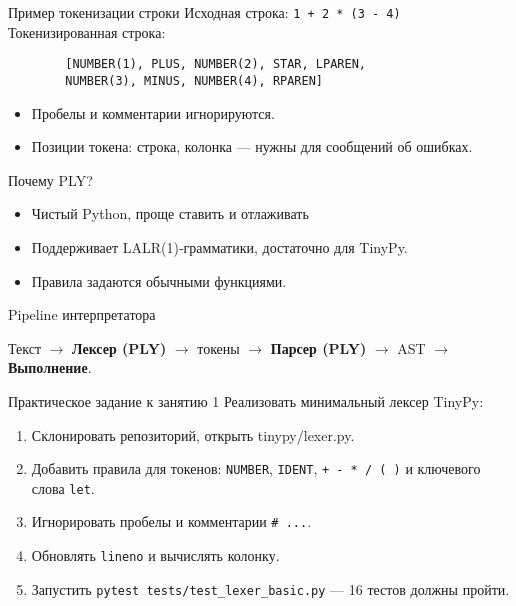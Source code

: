 \documentclass[aspectratio=169]{beamer}
\begin{document}
\begin{frame}[fragile]{Пример токенизации строки}
	Исходная строка: \texttt{1 + 2 * (3 - 4)} \newline
	Токенизированная строка:
	\begin{verbatim}
        [NUMBER(1), PLUS, NUMBER(2), STAR, LPAREN,
        NUMBER(3), MINUS, NUMBER(4), RPAREN]
    \end{verbatim}
	\begin{itemize}
		\item Пробелы и комментарии игнорируются.
		\item Позиции токена: строка, колонка — нужны для сообщений об ошибках.
	\end{itemize}
\end{frame}

\begin{frame}{Почему PLY?}
	\begin{itemize}
		\item Чистый Python, проще ставить и отлаживать
		\item Поддерживает LALR(1)‑грамматики, достаточно для TinyPy.
		\item Правила задаются обычными функциями.
	\end{itemize}
\end{frame}

\begin{frame}{Pipeline интерпретатора}
	\centering
	\begin{small}
		Текст $\rightarrow$ \textbf{Лексер (PLY)} $\rightarrow$ токены $\rightarrow$ \textbf{Парсер (PLY)} $\rightarrow$ AST $\rightarrow$ \textbf{Выполнение}.
	\end{small}
\end{frame}

\begin{frame}{Практическое задание к занятию 1}
	Реализовать минимальный лексер TinyPy:
	\begin{enumerate}
		\item Склонировать репозиторий, открыть tinypy/lexer.py.
		\item Добавить правила для токенов: \texttt{NUMBER}, \texttt{IDENT}, \texttt{+ - * / ( )} и ключевого слова \texttt{let}.
		\item Игнорировать пробелы и комментарии \texttt{\# ...}.
		\item Обновлять \texttt{lineno} и вычислять колонку.
		\item Запустить \texttt{pytest tests/test\_lexer\_basic.py} — 16 тестов должны пройти.
	\end{enumerate}
\end{frame}
\end{document}
